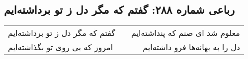 \begin{center}
\section*{رباعی شماره ۲۸۸: گفتم که مگر دل ز تو برداشته‌ایم}
\label{sec:sh288}
\begin{longtable}{l p{0.5cm} r}
گفتم که مگر دل ز تو برداشته‌ایم
&&
معلوم شد ای صنم که پنداشته‌ایم
\\
امروز که بی روی تو بگذاشته‌ایم
&&
دل را به بهانه‌ها فرو داشته‌ایم
\\
\end{longtable}
\end{center}
